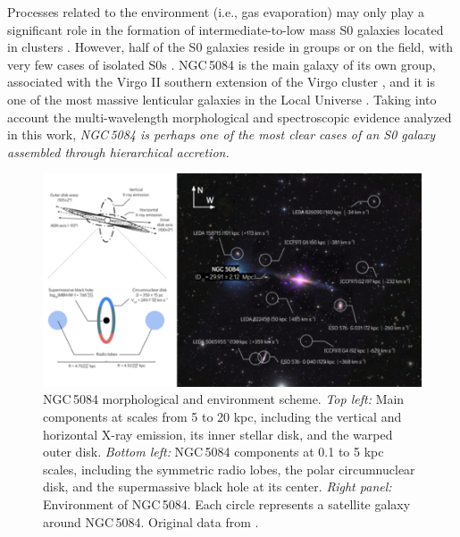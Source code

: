 \documentclass[modern]{CORE-AAS/aastex631}
\begin{document}
Processes related to the environment (i.e., gas evaporation) may only play a significant role in the formation of intermediate-to-low mass S0 galaxies located in clusters \citep{vollmer+2012aap537_143, cerulo+2017mnras472_254}. However, half of the S0 galaxies reside in groups or on the field, with very few cases of isolated S0s \citep{khim+2015apj220_3}. NGC\,5084 is the main galaxy of its own group, associated with the Virgo II southern extension of the Virgo cluster \citep{tully1982apj257_389}, and it is one of the most massive lenticular galaxies in the Local Universe \citep[more massive than 98\% of the S0 galaxies]{ohlson+2024aj167_31}. Taking into account the multi-wavelength morphological and spectroscopic evidence analyzed in this work, \emph{NGC\,5084 is perhaps one of the most clear cases of an S0 galaxy assembled through hierarchical accretion.}
\begin{figure}[t!]
\begin{center}
\includegraphics[trim={0 0 0 0}, clip, width=\textwidth]{FIGURES/NGC5084_environment_v2.png}
\caption{NGC\,5084 morphological and environment scheme. \emph{Top left:} Main components at scales from 5 to 20 kpc, including the vertical and horizontal X-ray emission, its inner stellar disk, and the warped outer disk. \emph{Bottom left:} NGC\,5084 components at 0.1 to 5 kpc scales, including the symmetric radio lobes, the polar circumnuclear disk, and the supermassive black hole at its center. \emph{Right panel:} Environment of NGC\,5084. Each circle represents a satellite galaxy around NGC\,5084. Original data from \citet{carignan+1997aj113_1585}.} 
\label{fig:NGC5084_environment}
\end{center}
\end{figure}
\end{document}
